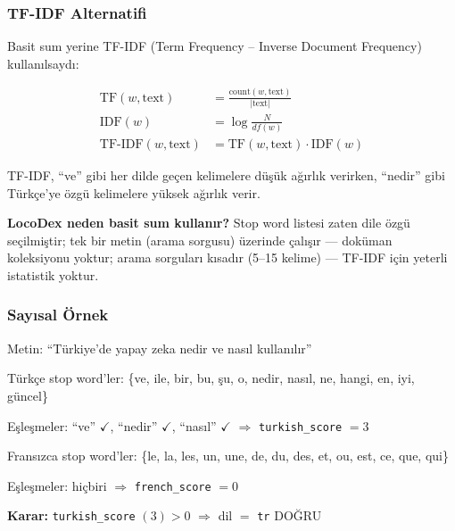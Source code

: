 \subsubsection{TF-IDF Alternatifi}

Basit sum yerine TF-IDF (Term Frequency -- Inverse Document Frequency) kullan{\i}lsayd{\i}:

\begin{align}
\mathrm{TF}(w, \text{text}) &= \frac{\mathrm{count}(w, \text{text})}{|\text{text}|} \label{eq:trust-tf} \\
\mathrm{IDF}(w) &= \log\frac{N}{df(w)} \label{eq:trust-idf} \\
\mathrm{TF\text{-}IDF}(w, \text{text}) &= \mathrm{TF}(w, \text{text}) \cdot \mathrm{IDF}(w) \label{eq:trust-tfidf}
\end{align}

TF-IDF, ``ve'' gibi her dilde ge\c{c}en kelimelere d\"{u}\c{s}\"{u}k a\u{g}{\i}rl{\i}k verirken, ``nedir'' gibi T\"{u}rk\c{c}e'ye \"{o}zg\"{u} kelimelere y\"{u}ksek a\u{g}{\i}rl{\i}k verir.

\textbf{LocoDex neden basit sum kullan{\i}r?} Stop word listesi zaten dile \"{o}zg\"{u} se\c{c}ilmi\c{s}tir; tek bir metin (arama sorgusu) \"{u}zerinde \c{c}al{\i}\c{s}{\i}r --- dok\"{u}man koleksiyonu yoktur; arama sorgular{\i} k{\i}sad{\i}r (5--15 kelime) --- TF-IDF i\c{c}in yeterli istatistik yoktur.

\subsubsection{Say{\i}sal \"{O}rnek}

\begin{ornek}
Metin: ``T\"{u}rkiye'de yapay zeka nedir ve nas{\i}l kullan{\i}l{\i}r''

T\"{u}rk\c{c}e stop word'ler: \{ve, ile, bir, bu, \c{s}u, o, nedir, nas{\i}l, ne, hangi, en, iyi, g\"{u}ncel\}

E\c{s}le\c{s}meler: ``ve'' $\checkmark$, ``nedir'' $\checkmark$, ``nas{\i}l'' $\checkmark$ $\Rightarrow$ \texttt{turkish\_score} $= 3$

Frans{\i}zca stop word'ler: \{le, la, les, un, une, de, du, des, et, ou, est, ce, que, qui\}

E\c{s}le\c{s}meler: hi\c{c}biri $\Rightarrow$ \texttt{french\_score} $= 0$

\textbf{Karar:} \texttt{turkish\_score} $(3) > 0$ $\Rightarrow$ dil $=$ \texttt{tr} \quad \color{codeGreen}DO\u{G}RU
\end{ornek}

